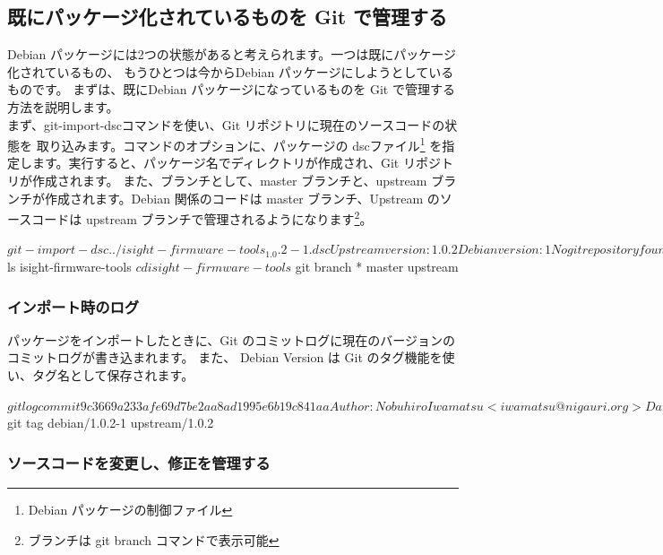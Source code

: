 \documentclass[mingoth,a4paper]{jsarticle}
\begin{document}
\subsection{既にパッケージ化されているものを Git で管理する}
Debian パッケージには2つの状態があると考えられます。一つは既にパッケージ化されているもの、
もうひとつは今からDebian パッケージにしようとしているものです。
まずは、既にDebian パッケージになっているものを Git で管理する方法を説明します。
\\

まず、git-import-dscコマンドを使い、Git リポジトリに現在のソースコードの状態を
取り込みます。コマンドのオプションに、パッケージの dscファイル\footnote{Debian パッケージの制御ファイル}
を指定します。実行すると、パッケージ名でディレクトリが作成され、Git リポジトリが作成されます。
また、ブランチとして、master ブランチと、upstream ブランチが作成されます。Debian 関係のコードは
 master 
ブランチ、Upstream のソースコードは upstream ブランチで管理されるようになります\footnote{ブランチは git branch コマンドで表示可能}。

\begin{commandline}
$ git-import-dsc ../isight-firmware-tools_1.0.2-1.dsc
Upstream version: 1.0.2
Debian version: 1
No git repository found, creating one.
Initialized empty Git repository in .git/
Everything imported under isight-firmware-tools
$ ls
isight-firmware-tools
$ cd isight-firmware-tools
$ git branch
* master
  upstream
\end{commandline}

\subsubsection{インポート時のログ}

パッケージをインポートしたときに、Git のコミットログに現在のバージョンのコミットログが書き込まれます。
また、 Debian Version は Git のタグ機能を使い、タグ名として保存されます。

\begin{commandline}
$ git log
commit 9c3669a233afe69d7be2aa8ad1995e6b19c841aa
Author: Nobuhiro Iwamatsu <iwamatsu@nigauri.org>
Date:   Sun Apr 6 21:48:40 2008 +0900

    Imported Debian patch 1.0.2-1
$ git tag
debian/1.0.2-1
upstream/1.0.2
\end{commandline}

\subsubsection{ソースコードを変更し、修正を管理する}
\end{document}
